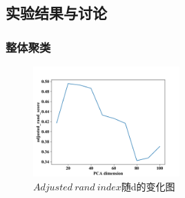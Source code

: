 \documentclass[UTF8]{ctexart}
\begin{document}
\subsection{实验结果与讨论}

\subsubsection{整体聚类}

\begin{figure}[!h]
  \includegraphics[width=0.5\textwidth]{./figures/cluster_adjusted_rand_score.png}
  \centering
  \caption{$Adjusted~rand~index$随d的变化图}
  \label{cluster_adjusted_rand_score}
\end{figure}
\end{document}
